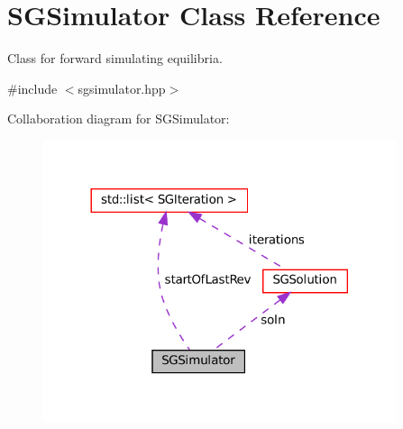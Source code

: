 \hypertarget{classSGSimulator}{}\section{S\+G\+Simulator Class Reference}
\label{classSGSimulator}


Class for forward simulating equilibria.  




{\ttfamily \#include $<$sgsimulator.\+hpp$>$}



Collaboration diagram for S\+G\+Simulator\+:
\nopagebreak
\begin{figure}[H]
\begin{center}
\leavevmode
\includegraphics[width=293pt]{classSGSimulator__coll__graph}
\end{center}
\end{figure}
